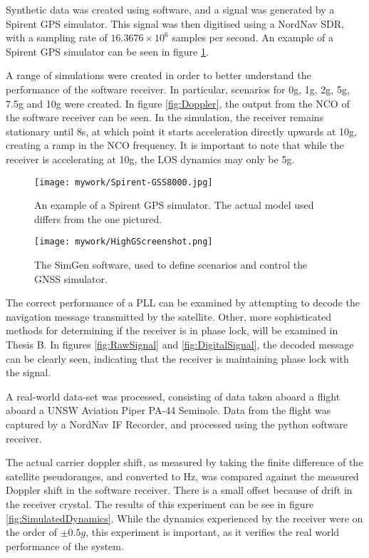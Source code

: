 Synthetic data was created using software, and a signal was generated by a Spirent \ac{GPS} simulator. This signal was then digitised using a NordNav \ac{SDR}, with a sampling rate of $16.3676 \times 10^6$ samples per second. An example of a Spirent \ac{GPS} simulator can be seen in figure \ref{fig:Spirent}.

A range of simulations were created in order to better understand the performance of the software receiver. In particular, scenarios for 0g, 1g, 2g, 5g, 7.5g and 10g were created. In figure \ref{fig:Doppler}, the output from the \ac{NCO} of the software receiver can be seen. In the simulation, the receiver remains stationary until 8s, at which point it starts acceleration directly upwards at 10g, creating a ramp in the \ac{NCO} frequency. It is important to note that while the receiver is accelerating at 10g, the \ac{LOS} dynamics may only be 5g. 

\begin{figure}[!htb] 
    \centering
    \texttt{[image: mywork/Spirent-GSS8000.jpg]} 
    \caption{An example of a Spirent \ac{GPS} simulator. The actual model used differs from the one pictured.}
    \label{fig:Spirent}
\end{figure}

\begin{figure}[!htb] 
    \centering
    \texttt{[image: mywork/HighGScreenshot.png]} 
    \caption{The SimGen software, used to define scenarios and control the \ac{GNSS} simulator.}
    \label{fig:HighGScreenshot}
\end{figure}


The correct performance of a \ac{PLL} can be examined by attempting to decode the navigation message transmitted by the satellite. Other, more sophisticated methods for determining if the receiver is in phase lock, will be examined in Thesis B. In figures \ref{fig:RawSignal} and \ref{fig:DigitalSignal}, the decoded message can be clearly seen, indicating that the receiver is maintaining phase lock with the signal.




A real-world data-set was processed, consisting of data taken aboard a flight aboard a UNSW Aviation Piper PA-44 Seminole. Data from the flight was captured by a NordNav IF Recorder, and processed using the python software receiver. 

The actual carrier doppler shift, as measured by taking the finite difference of the satellite pseudoranges, and converted to Hz, was compared against the measured Doppler shift in the software receiver. There is a small offset because of drift in the receiver crystal. The results of this experiment can be see in figure \ref{fig:SimulatedDynamics}. While the dynamics experienced by the receiver were on the order of $\pm 0.5g$, this experiment is important, as it verifies the real world performance of the system. 

